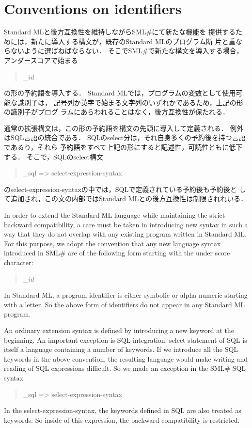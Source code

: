 \documentclass{jbook}
\newcommand{\txt}[2]{#2}
\newcommand{\smlsharp}{SML\#}
\newenvironment{program}{\begin{quote}\begin{tt}}%
                        {\end{tt}\end{quote}}
\begin{document}
\section{\txt{識別名に関する約束}{Conventions on identifiers}}
\ifjp%
	Standard MLと後方互換性を維持しながら\smlsharp{}にて新たな機能を
提供するためには，新たに導入する構文が，既存のStandard MLのプログラム断
片と重ならないように選ばねばならない．
	そこで\smlsharp{}で新たな構文を導入する場合，アンダースコアで始まる
\begin{program}
\_$id$ 
\end{program}
の形の予約語を導入する．
	Standard MLでは，プログラムの変数として使用可能な識別子は，
記号列か英字で始まる文字列のいずれかであるため，上記の形の識別子がプログ
ラムにあらわれることはなく，後方互換性が保たれる．

	通常の拡張構文は，この形の予約語を構文の先頭に導入して定義される．
	例外はSQL言語の統合である．
	SQLのselect分は，それ自身多くの予約後を持つ言語であるり，それら
予約語をすべて上記の形にすると記述性，可読性ともに低下する．
	そこで，SQLのselect構文
\begin{program}
\_sql => {\rm select-expression-syntax}
\end{program}
のselect-expression-syntaxの中では，SQLで定義されている予約後も予約後と
して追加され，この文の内部ではStandard MLとの後方互換性は制限されれいる．

\else%
	In order to extend the Standard ML language while maintaining
the strict backward compatibility, a care must be taken in introducing
new syntax in such a way that they do not overlap with any existing
program written in Standard ML.
	For this purpose, we adopt the convention that any new language
syntax introduced in \smlsharp{} are of the following form starting with
the under score character:
\begin{program}
\_$id$ 
\end{program}
	In Standard ML, a program identifier is either symbolic or alpha
numeric starting with a letter.
	So the above form of identifiers do not appear in any Standard
ML program.

	An ordinary extension syntax is defined by introducing a new
keyword at the beginning.
	An important exception is SQL integration.
	select statement of SQL is itself a language containing a number
of keywords.
	If we introduce all the SQL keywords in the above convention,
the resulting language would make writing and reading of SQL expressions
difficult.
	So we made an exception in the \smlsharp{} SQL syntax
\begin{program}
\_sql => {\rm select-expression-syntax}
\end{program}
	In the select-expression-syntax, the keywords defined in SQL
are also treated as keywords.
	So inside of this expression, the backward compatibility is
restricted.
\end{document}
